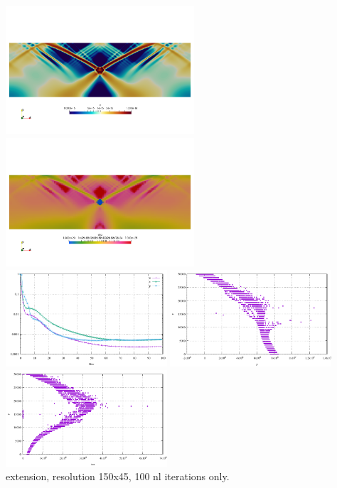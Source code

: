 \begin{center}
\includegraphics[width=7cm]{python_codes/fieldstone_70/compression/e}
\includegraphics[width=7cm]{python_codes/fieldstone_70/compression/etaeff}\\
\includegraphics[width=6cm]{python_codes/fieldstone_70/compression/conv.pdf}
\includegraphics[width=6cm]{python_codes/fieldstone_70/compression/pressure.pdf}\\
\includegraphics[width=6cm]{python_codes/fieldstone_70/compression/tau.pdf}\\
extension, resolution 150x45, 100 nl iterations only.
\end{center}

